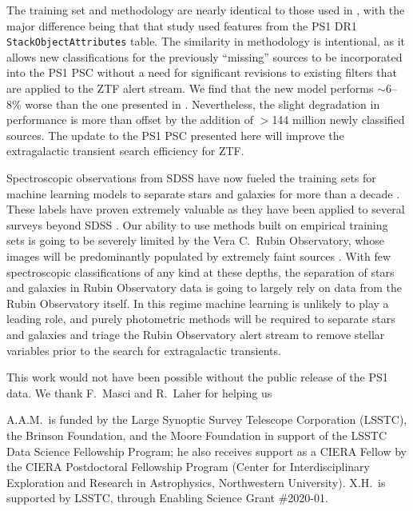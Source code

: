 \documentclass[twocolumn]{aastex63}
\begin{document}
The training set and methodology are nearly identical to those used in
\citet{Tachibana18}, with the major difference being that that study used
features from the PS1 DR1 \texttt{StackObjectAttributes} table. The similarity
in methodology is intentional, as it allows new classifications for the
previously ``missing'' sources to be incorporated into the PS1 PSC without a
need for significant revisions to existing filters that are applied to the ZTF
alert stream. We find that the new model performs $\sim$6--8\% worse than the
one presented in \citet[][see Table~\ref{tbl:thresh}]{Tachibana18}.
Nevertheless, the slight degradation in performance is more than offset by the
addition of $>$144 million newly classified sources. The update to the PS1 PSC
presented here will improve the extragalactic transient search efficiency for
ZTF.

Spectroscopic observations from SDSS have now fueled the training sets for
machine learning models to separate stars and galaxies for more than a decade
\citep[e.g.,][]{Ball06,Beck20}. These labels have proven extremely valuable as
they have been applied to several surveys beyond SDSS
\citep[e.g.,][]{Miller17,Beck20}. Our ability to use methods built on
empirical training sets is going to be severely limited by the Vera C.\ Rubin
Observatory, whose images will be predominantly populated by extremely faint
sources \citep[$r \approx 24$\,mag;][]{Ivezic19}. With few spectroscopic
classifications of any kind at these depths, the separation of stars and
galaxies in Rubin Observatory data is going to largely rely on data from the
Rubin Observatory itself. In this regime machine learning is unlikely to play
a leading role, and purely photometric methods will be required to separate
stars and galaxies \citep[e.g.,][]{Slater20} and triage the Rubin Observatory
alert stream to remove stellar variables prior to the search for extragalactic
transients.

\acknowledgments

This work would not have been possible without the public release of the
PS1 data. We thank F.~Masci and R.~Laher for helping us 

A.A.M.~is funded by the Large Synoptic Survey Telescope Corporation (LSSTC),
the Brinson Foundation, and the Moore Foundation in support of the LSSTC Data
Science Fellowship Program; he also receives support as a CIERA Fellow by the
CIERA Postdoctoral Fellowship Program (Center for Interdisciplinary
Exploration and Research in Astrophysics, Northwestern University). X.H.~is
supported by LSSTC, through Enabling Science Grant \#2020-01.
\end{document}
